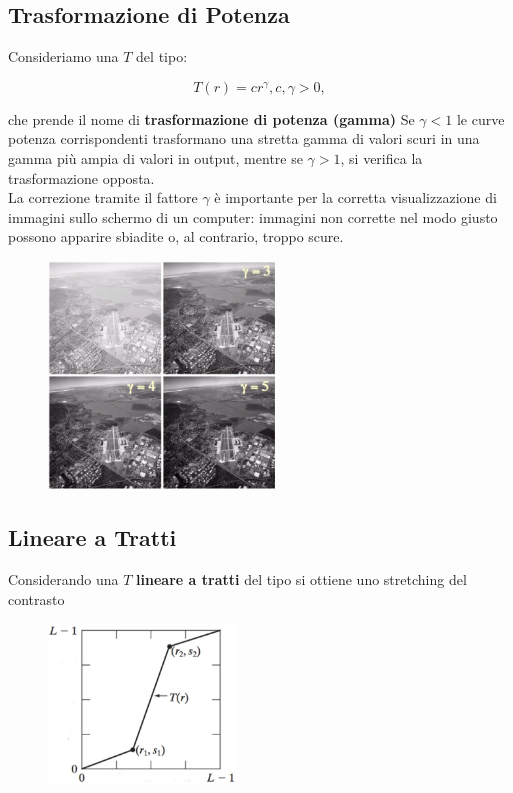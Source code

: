 \subsection{Trasformazione di Potenza}

Consideriamo una $T$ del tipo:

$$
    T(r) = cr^\gamma, c, \gamma > 0,
$$

che prende il nome di \textbf{trasformazione di potenza (gamma)}
Se $\gamma < 1$ le curve potenza corrispondenti trasformano una stretta
gamma di valori scuri in una gamma più ampia di valori in output,
mentre se $\gamma > 1$, si verifica la trasformazione opposta.\\
La correzione tramite il fattore $\gamma$ è importante per la corretta
visualizzazione di immagini sullo schermo di un computer:
immagini non corrette nel modo giusto possono apparire sbiadite o,
al contrario, troppo scure.

\begin{figure}[H]
    \centering
    \includegraphics[width=6cm, keepaspectratio]{capitoli/immagini/imgs/foto_esempio_5.jpg}
\end{figure}

\subsection{Lineare a Tratti}

Considerando una $T$ \textbf{lineare a tratti} del tipo si ottiene uno
stretching del contrasto

\begin{figure}[H]
    \centering
    \includegraphics[width=5cm, keepaspectratio]{capitoli/immagini/imgs/lineare_a_tratti_esempio_6.jpg}
\end{figure}

